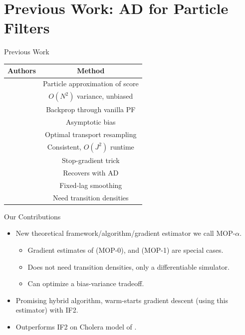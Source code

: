 \documentclass{beamer}
\begin{document}
\section{Previous Work: AD for Particle Filters}


\begin{frame}{Previous Work}

    \begin{table}[h!]
        \centering
        \begin{tabular}{||c c||} 
         \hline
         Authors & Method \\ [0.5ex] 
         \hline\hline
         \cite{poyiadjis11} & Particle approximation of score
         \\ & $O(N^2)$ variance, unbiased \\
         \hline
         \cite{blei2018vsmc} & Backprop through vanilla PF \\ 
         & Asymptotic bias \\
         \hline
         \cite{corenflos21} & Optimal transport resampling \\
         & Consistent, $O(J^2)$ runtime \\
         \hline
         \cite{scibior21} & Stop-gradient trick \\ 
         & Recovers \cite{poyiadjis11} with AD \\
         \hline 
         \cite{singh22} & Fixed-lag smoothing \\ 
         & Need transition densities \\ 
         \hline
        \end{tabular}
        \label{table:lit-review}
    \end{table}
\end{frame}


\begin{frame}{Our Contributions}
    \begin{itemize}
        \item New theoretical framework/algorithm/gradient estimator we call MOP-$\alpha$.
        \begin{itemize}
            \item \pause Gradient estimates of \cite{blei2018vsmc} (MOP-0), \cite{poyiadjis11} and \cite{scibior2021dpf} (MOP-1) are special cases.
            \item \pause Does not need transition densities, only a differentiable simulator.
            \item \pause Can optimize a bias-variance tradeoff. 
        \end{itemize}
        \item \pause Promising hybrid algorithm, warm-starts gradient descent (using this estimator) with IF2.
        \item \pause Outperforms IF2 on Cholera model of \cite{king08}.
    \end{itemize}
\end{frame}
\end{document}
